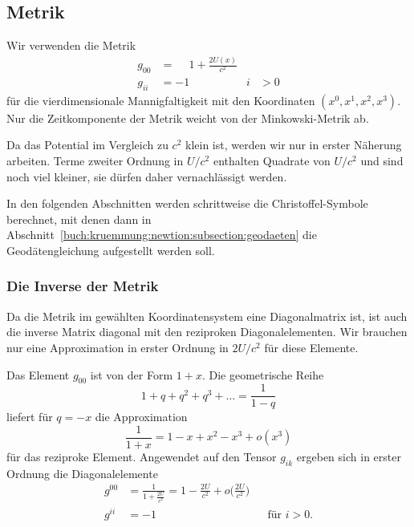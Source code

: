 %
%
\subsection{Metrik}
Wir verwenden die Metrik
\begin{equation}
\begin{aligned}
g_{00} &= \phantom{-}1 + \frac{2U(x)}{c^2} \\
g_{ii} &= -1\qquad &i&>0
\end{aligned}
\label{buch:kruemmung:newton:eqn:metrik}
\end{equation}
für die vierdimensionale Mannigfaltigkeit mit den Koordinaten
$(x^0,x^1,x^2,x^3)$.
Nur die Zeitkomponente der Metrik weicht von der Minkowski-Metrik ab.
%

Da das Potential im Vergleich zu $c^2$ klein ist, werden wir nur in
erster Näherung arbeiten.
Terme zweiter Ordnung in $U/c^2$ enthalten Quadrate von $U/c^2$ und sind
noch viel kleiner, sie dürfen daher vernachlässigt werden.

In den folgenden Abschnitten werden schrittweise die Christoffel-Symbole
berechnet, mit denen dann in
Abschnitt~\ref{buch:kruemmung:newtion:subsection:geodaeten}
die Geodätengleichung aufgestellt werden soll.

%
%
\subsubsection{Die Inverse der Metrik}
Da die Metrik im gewählten Koordinatensystem eine Diagonalmatrix ist,
ist auch die inverse Matrix diagonal mit den reziproken Diagonalelementen.
Wir brauchen nur eine Approximation in erster Ordnung in $2U/c^2$
für diese Elemente.

Das Element $g_{00}$ ist von der Form $1+x$.
Die geometrische Reihe
\[
1+q+q^2+q^3+\dots = \frac{1}{1-q}
\]
liefert für $q=-x$ die Approximation
\[
\frac{1}{1+x} = 1-x+x^2-x^3+o(x^3)
\]
für das reziproke Element.
Angewendet auf den Tensor $g_{ik}$ ergeben sich in erster Ordnung
die Diagonalelemente
\begin{equation}
\begin{aligned}
g^{00}
&=
\frac{1}{\displaystyle 1+\frac{2U}{c^2}}
=
1-\frac{2U}{c^2}+o\biggl(\frac{2U}{c^2}\biggr)
\\
g^{ii}&= -1
&&\text{für $i>0$.}
\end{aligned}
\end{equation}

%
%
